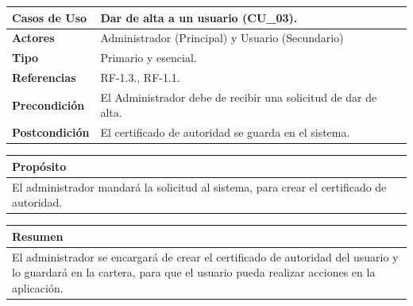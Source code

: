 \begin{itemize}
    \begin{table}[h!]
        \centering
        \begin{tabular}{|l|p{}|}
            \hline
            \textbf{Casos de Uso}   &   Dar de alta a un usuario (CU\_03). \\
            \hline 
            \textbf{Actores}        &   Administrador (Principal) y Usuario (Secundario)\\ 
            \hline 
            \textbf{Tipo}           &   Primario y esencial. \\ 
            \hline
            \textbf{Referencias}    &   RF-1.3., RF-1.1. \\ 
            \hline
            \textbf{Precondición}   &   El Administrador debe de recibir una solicitud de dar de alta. \\ 
            \hline
            \textbf{Postcondición}  &   El certificado de autoridad se guarda en el sistema. \\ 
            \hline
        \end{tabular}
        
        \vspace{5mm}
        
        \begin{tabular}{|p{\textwidth}|}
            \hline
            \rowcolor{SeaGreen} \textbf{Propósito} \\
            \hline
            \multicolumn{1}{|p{12cm}|}{El administrador mandará la solicitud al sistema, para crear el certificado de 
            autoridad.} \\ [0.5ex]
            \hline
        \end{tabular}
        
        \vspace{5mm}
        
        \begin{tabular}{|p{\textwidth}|}
            \hline
            \rowcolor{SeaGreen} \textbf{Resumen} \\
            \hline
            \multicolumn{1}{|p{12cm}|}{El administrador se encargará de crear el certificado de autoridad del usuario y
            lo guardará en la cartera, para que el usuario pueda realizar acciones en la aplicación.} \\ [0.5ex]
            \hline
        \end{tabular}
        
        \vspace{5mm}
        

\end{table}
\end{itemize}
